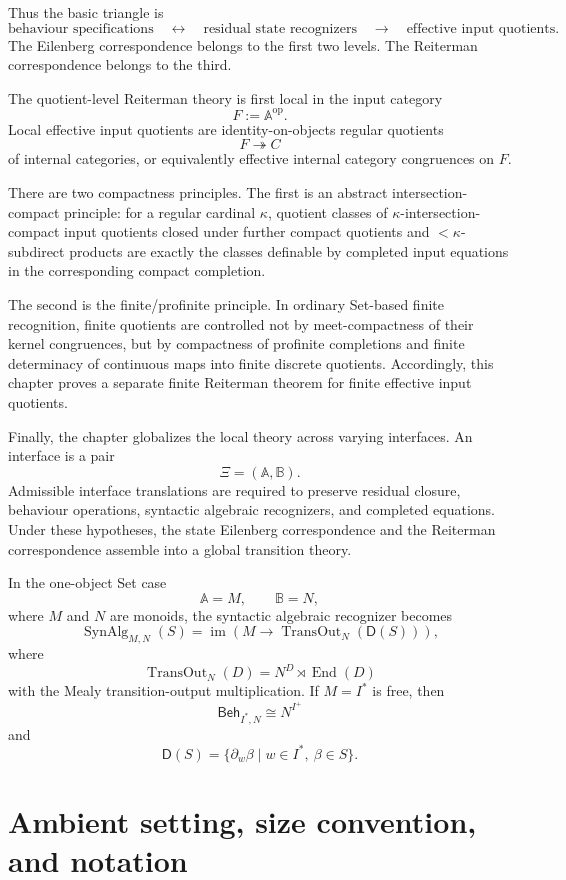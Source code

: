 Thus the basic triangle is
\[
\text{behaviour specifications}
\quad\longleftrightarrow\quad
\text{residual state recognizers}
\quad\longrightarrow\quad
\text{effective input quotients}.
\]
The Eilenberg correspondence belongs to the first two levels. The Reiterman
correspondence belongs to the third.

The quotient-level Reiterman theory is first local in the input category
\[
F:=\mathbb A^{\mathrm{op}}.
\]
Local effective input quotients are identity-on-objects regular quotients
\[
F\twoheadrightarrow C
\]
of internal categories, or equivalently effective internal category
congruences on \(F\).

There are two compactness principles. The first is an abstract
intersection-compact principle: for a regular cardinal \(\kappa\), quotient
classes of \(\kappa\)-intersection-compact input quotients closed under
further compact quotients and \(<\kappa\)-subdirect products are exactly the
classes definable by completed input equations in the corresponding compact
completion.

The second is the finite/profinite principle. In ordinary Set-based finite
recognition, finite quotients are controlled not by meet-compactness of their
kernel congruences, but by compactness of profinite completions and finite
determinacy of continuous maps into finite discrete quotients. Accordingly,
this chapter proves a separate finite Reiterman theorem for finite effective
input quotients.

Finally, the chapter globalizes the local theory across varying interfaces.
An interface is a pair
\[
\Xi=(\mathbb A,\mathbb B).
\]
Admissible interface translations are required to preserve residual closure,
behaviour operations, syntactic algebraic recognizers, and completed
equations. Under these hypotheses, the state Eilenberg correspondence and the
Reiterman correspondence assemble into a global transition theory.

In the one-object Set case
\[
\mathbb A=M,
\qquad
\mathbb B=N,
\]
where \(M\) and \(N\) are monoids, the syntactic algebraic recognizer becomes
\[
\operatorname{SynAlg}_{M,N}(S)
=
\operatorname{im}
\left(
M\to
\operatorname{TransOut}_N(\mathsf D(S))
\right),
\]
where
\[
\operatorname{TransOut}_N(D)
=
N^D\rtimes \operatorname{End}(D)
\]
with the Mealy transition-output multiplication. If \(M=I^\ast\) is free,
then
\[
\mathsf{Beh}_{I^\ast,N}\cong N^{I^+}
\]
and
\[
\mathsf D(S)
=
\{\partial_w\beta\mid w\in I^\ast,\ \beta\in S\}.
\]

\section{Ambient setting, size convention, and notation}
\label{sec:eilenberg-reiterman-ambient-setting}

